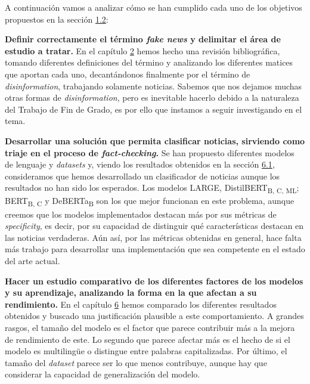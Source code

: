 A continuación vamos a analizar cómo se han cumplido cada uno de los objetivos propuestos en la sección \hyperref[sec:objetivos]{1.2}:

\textbf{Definir correctamente el término \emph{fake news} y delimitar el área de estudio a tratar.} En el capítulo \hyperref[sec:defs]{2} hemos hecho una revisión bibliográfica, tomando diferentes definiciones del término y analizando los diferentes matices que aportan cada uno, decantándonos finalmente por el término de \textit{disinformation}, trabajando solamente noticias. Sabemos que nos dejamos muchas otras formas de \textit{disinformation}, pero es inevitable hacerlo debido a la naturaleza del Trabajo de Fin de Grado, es por ello que instamos a seguir investigando en el tema.

\textbf{Desarrollar una solución que permita clasificar noticias, sirviendo como triaje en el proceso de \textit{fact-checking}.} Se han propuesto diferentes modelos de lenguaje y \textit{datasets} y, viendo los resultados obtenidos en la sección \hyperref[sec:results]{6.1}, consideramos que hemos desarrollado un clasificador de noticias aunque los resultados no han sido los esperados. Los modelos LARGE, {DistilBERT}\textsubscript{B, C, ML}; {BERT}\textsubscript{B, C} y {DeBERTa}\textsubscript{B} son los que mejor funcionan en este problema, aunque creemos que los modelos implementados destacan más por sus métricas de \textit{specificity}, es decir, por su capacidad de distinguir qué características destacan en las noticias verdaderas. Aún así, por las métricas obtenidas en general, hace falta más trabajo para desarrollar una implementación que sea competente en el estado del arte actual.

\textbf{Hacer un estudio comparativo de los diferentes factores de los modelos y su aprendizaje, analizando la forma en la que afectan a su rendimiento.} En el capítulo \hyperref[chapter:6]{6} hemos comparado los diferentes resultados obtenidos y buscado una justificación plausible a este comportamiento. A grandes rasgos, el tamaño del modelo es el factor que parece contribuir más a la mejora de rendimiento de este. Lo segundo que parece afectar más es el hecho de si el modelo es multilingüe o distingue entre palabras capitalizadas. Por último, el tamaño del \textit{dataset} parece ser lo que menos contribuye, aunque hay que considerar la capacidad de generalización del modelo.

